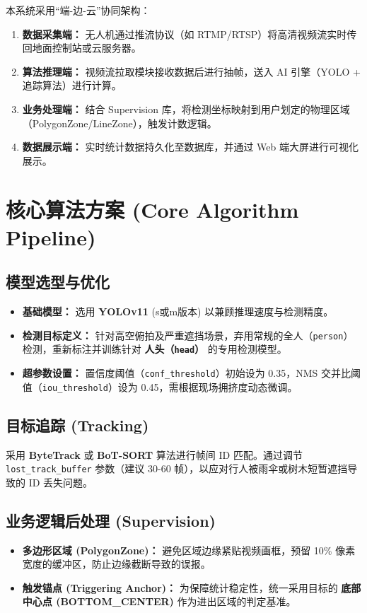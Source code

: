 \documentclass[a4paper, 11pt, fontset=fandol]{ctexart}
\begin{document}
本系统采用“端-边-云”协同架构：
\begin{enumerate}
    \item \textbf{数据采集端：} 无人机通过推流协议（如 RTMP/RTSP）将高清视频流实时传回地面控制站或云服务器。
    \item \textbf{算法推理端：} 视频流拉取模块接收数据后进行抽帧，送入 AI 引擎（YOLO + 追踪算法）进行计算。
    \item \textbf{业务处理端：} 结合 Supervision 库，将检测坐标映射到用户划定的物理区域（PolygonZone/LineZone），触发计数逻辑。
    \item \textbf{数据展示端：} 实时统计数据持久化至数据库，并通过 Web 端大屏进行可视化展示。
\end{enumerate}

\section{核心算法方案 (Core Algorithm Pipeline)}

\subsection{模型选型与优化}
\begin{itemize}
    \item \textbf{基础模型：} 选用 \textbf{YOLOv11} (s或m版本) 以兼顾推理速度与检测精度。
    \item \textbf{检测目标定义：} 针对高空俯拍及严重遮挡场景，弃用常规的全人（\texttt{person}）检测，重新标注并训练针对 \textbf{人头（\texttt{head}）} 的专用检测模型。
    \item \textbf{超参数设置：} 置信度阈值（\texttt{conf\_threshold}）初始设为 0.35，NMS 交并比阈值（\texttt{iou\_threshold}）设为 0.45，需根据现场拥挤度动态微调。
\end{itemize}

\subsection{目标追踪 (Tracking)}
采用 \textbf{ByteTrack} 或 \textbf{BoT-SORT} 算法进行帧间 ID 匹配。通过调节 \texttt{lost\_track\_buffer} 参数（建议 30-60 帧），以应对行人被雨伞或树木短暂遮挡导致的 ID 丢失问题。

\subsection{业务逻辑后处理 (Supervision)}
\begin{itemize}
    \item \textbf{多边形区域 (PolygonZone)：} 避免区域边缘紧贴视频画框，预留 10\% 像素宽度的缓冲区，防止边缘截断导致的误报。
    \item \textbf{触发锚点 (Triggering Anchor)：} 为保障统计稳定性，统一采用目标的 \textbf{底部中心点 (BOTTOM\_CENTER)} 作为进出区域的判定基准。
\end{itemize}
\end{document}
